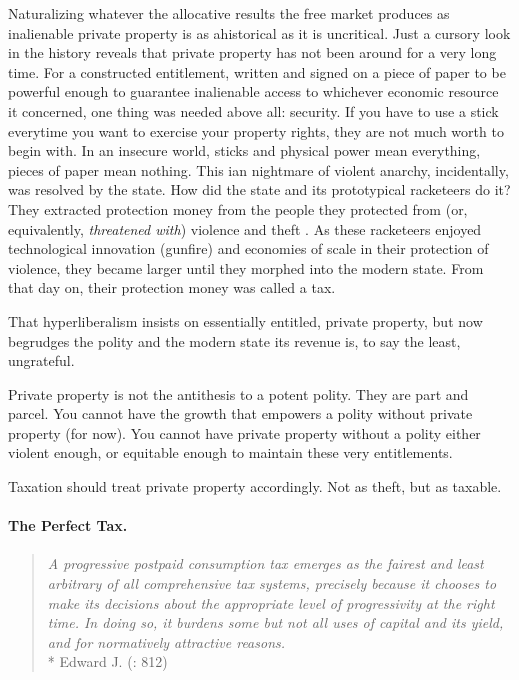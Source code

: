 Naturalizing whatever the allocative results the free market produces as inalienable private property is as ahistorical as it is uncritical. Just a cursory look in the history reveals that  private property has not been around for a very long time. For a constructed entitlement, written and signed on a piece of paper to be powerful enough to guarantee inalienable access to whichever economic resource it concerned, one thing was needed above all: security. If you have to use a stick everytime you want to exercise your property rights, they are not much worth to begin with. In an insecure world, sticks and physical power mean everything, pieces of paper mean nothing. This \citeauthor{Hobbes-1651-aa}ian nightmare of violent anarchy, incidentally, was resolved by the state. How did the state and its prototypical racketeers do it? They extracted protection money from the people they protected from (or, equivalently, \emph{threatened with}) violence and theft \citep{Tilly-1985-aa}. As these racketeers enjoyed technological innovation (gunfire) and economies of scale in their protection of violence, they became larger until they morphed into the modern state. From that day on, their protection money was called a tax.

That hyperliberalism insists on essentially entitled, private property, but now begrudges the polity and the modern state its revenue is, to say the least, ungrateful.

Private property is not the antithesis to a potent polity. They are part and parcel. You cannot have the growth that empowers a polity without private property (for now). You cannot have private property without a polity either violent enough, or equitable enough to maintain these very entitlements.

Taxation should treat private property accordingly. Not as theft, but as taxable.

\paragraph{The Perfect Tax.}

\begin{quote}
	\emph{A progressive postpaid consumption tax emerges as the fairest and least arbitrary of all comprehensive tax systems, precisely because it chooses to make its decisions about the appropriate level of progressivity at the right time. In doing so, it burdens some but not all uses of capital and its yield, and for normatively attractive reasons.}\\*
	Edward J. \citeauthor{McCaffery2005} (\citeyear{McCaffery2005}: 812)
\end{quote}

